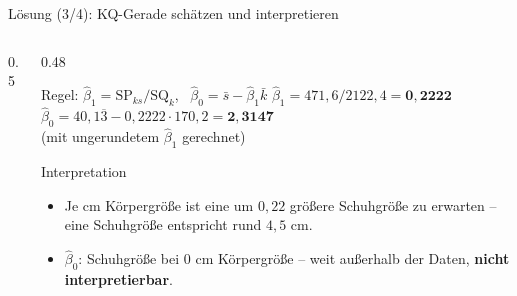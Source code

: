 \documentclass[aspectratio=169,11pt]{beamer}
\newcommand{\koerperpunkte}{\addplot[only marks, mark=*, mark size=2.2pt, color=hsbiblue]
  coordinates {(164,39) (162,38) (168,39) (198,46) (166,40) (166,39) (192,45) (160,37) (151,36) (175,42) (180,43) (160,38) (168,41) (175,40) (168,39)};}
\newcommand{\SQk}{\text{SQ}_k}
\newcommand{\SPks}{\text{SP}_{ks}}
\begin{document}
\begin{frame}{Lösung (3/4): KQ-Gerade schätzen und interpretieren}
  \begin{columns}[T]
    \begin{column}{0.5\textwidth}
    \end{column}
    \begin{column}{0.48\textwidth}
      \small
      \begin{block}{Regel: $\hat{\beta}_1 = \SPks / \SQk$, \ $\hat{\beta}_0 = \bar{s} - \hat{\beta}_1 \bar{k}$}
        $\hat{\beta}_1 = 471{,}6 / 2122{,}4 = \mathbf{0{,}2222}$\\[3pt]
        $\hat{\beta}_0 = 40{,}1\overline{3} - 0{,}2222 \cdot 170{,}2 = \mathbf{2{,}3147}$\\[2pt]
        \footnotesize (mit ungerundetem $\hat{\beta}_1$ gerechnet)
      \end{block}
      \begin{exampleblock}{Interpretation}
        \begin{itemize}
          \item Je cm Körpergröße ist eine um $0{,}22$ größere Schuhgröße zu
                erwarten -- eine Schuhgröße entspricht rund $4{,}5$ cm.
          \item $\hat{\beta}_0$: Schuhgröße bei $0$ cm Körpergröße --
                weit außerhalb der Daten, \textbf{nicht interpretierbar}.
        \end{itemize}
      \end{exampleblock}
    \end{column}
  \end{columns}
\end{frame}
\end{document}
